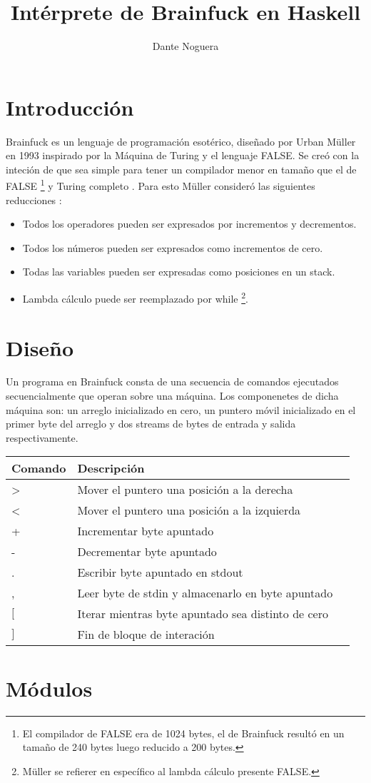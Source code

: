 \documentclass[a4paper, 12pt]{article}
\title{Int\'erprete de Brainfuck en Haskell}
\author{Dante Noguera}
\date{}
\begin{document}
\section*{Introducción}

Brainfuck es un lenguaje de programación esotérico, diseñado por Urban Müller en 1993 inspirado por la Máquina de Turing y el lenguaje FALSE.
Se creó con la inteción de que sea simple para tener un compilador menor en tamaño que el de FALSE \footnote{El compilador de FALSE era de 1024 bytes, el de Brainfuck resultó en un tamaño de 240 bytes luego reducido a 200 bytes.} y Turing completo \cite{w}. 
Para esto Müller consideró las siguientes reducciones \cite{y}:
\begin{itemize}
	\item Todos los operadores pueden ser expresados por incrementos y decrementos.
	\item Todos los números pueden ser expresados como incrementos de cero.
	\item Todas las variables pueden ser expresadas como posiciones en un stack.
	\item Lambda cálculo puede ser reemplazado por while \footnote{Müller se refierer en específico al lambda cálculo presente FALSE.}.
\end{itemize}


\section*{Diseño}

Un programa en Brainfuck consta de una secuencia de comandos ejecutados secuencialmente que operan sobre una máquina. Los componenetes de dicha máquina son: un arreglo inicializado en cero, un puntero móvil inicializado en el primer byte del arreglo y dos streams de bytes de entrada y salida respectivamente.

\begin{center}
\begin{tabular}{ |l|l|l| } 
 \hline
 Comando & Descripción \\
 \hline
 \textgreater & Mover el puntero una posición a la derecha \\ 
 \textless & Mover el puntero una posición a la izquierda \\ 
 + & Incrementar byte apuntado \\ 
 - & Decrementar byte apuntado \\ 
 . & Escribir byte apuntado en stdout \\ 
 , & Leer byte de stdin y almacenarlo en byte apuntado \\ 
 $[$ & Iterar mientras byte apuntado sea distinto de cero \\ 
 $]$ & Fin de bloque de interación \\ 
 \hline
\end{tabular}
\end{center}




\section*{Módulos}



\nocite{*}
\printbibliography
\end{document}
